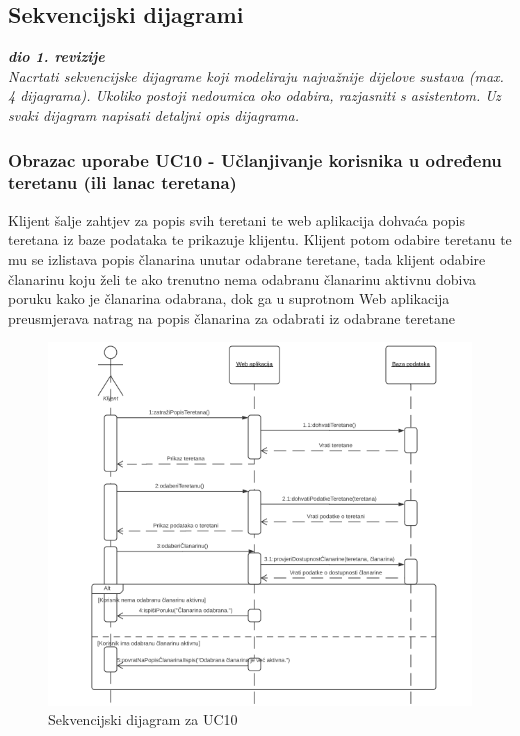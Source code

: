 				
				\eject
					
				
			\subsection{Sekvencijski dijagrami}
				
				\textbf{\textit{dio 1. revizije}}\\
				
				\textit{Nacrtati sekvencijske dijagrame koji modeliraju najvažnije dijelove sustava (max. 4 dijagrama). Ukoliko postoji nedoumica oko odabira, razjasniti s asistentom. Uz svaki dijagram napisati detaljni opis dijagrama.}
				
					\subsubsection{Obrazac uporabe UC10 - Učlanjivanje korisnika u određenu teretanu (ili lanac teretana)}
					\textit{}Klijent šalje zahtjev za popis svih teretani te web aplikacija dohvaća popis teretana
                    iz baze podataka te prikazuje klijentu. Klijent potom odabire teretanu te mu se izlistava
                    popis članarina unutar odabrane teretane, tada klijent odabire članarinu koju želi te 
                    ako trenutno nema odabranu članarinu aktivnu dobiva poruku kako je članarina odabrana, 
                    dok ga u suprotnom Web aplikacija preusmjerava natrag na popis članarina za odabrati
                    iz odabrane teretane\\
                    
                    \begin{figure}[H]
			            \includegraphics[scale=0.9]{slike/UC10.PNG} %
			            \centering
			            \caption{Sekvencijski dijagram za UC10}
			            \label{fig:promjene}
		            \end{figure}
                    
